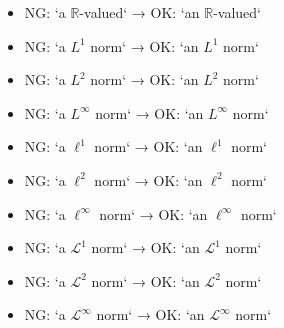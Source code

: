\begin{minipage}{0.5\textwidth}
	\begin{itemize}
		\item NG: `a $\mathbb{R}$-valued` → OK: `an $\mathbb{R}$-valued`
		\item NG: `a $L^1$ norm` → OK: `an $L^1$ norm`
		\item NG: `a $L^2$ norm` → OK: `an $L^2$ norm`
		\item NG: `a $L^\infty$ norm` → OK: `an $L^\infty$ norm`
		\item NG: `a $\ell^1$ norm` → OK: `an $\ell^1$ norm`
	\end{itemize}
\end{minipage}
\begin{minipage}{0.5\textwidth}
	\begin{itemize}
		\item NG: `a $\ell^2$ norm` → OK: `an $\ell^2$ norm`
		\item NG: `a $\ell^\infty$ norm` → OK: `an $\ell^\infty$ norm`
		\item NG: `a $\mathcal{L}^1$ norm` → OK: `an $\mathcal{L}^1$ norm`
		\item NG: `a $\mathcal{L}^2$ norm` → OK: `an $\mathcal{L}^2$ norm`
		\item NG: `a $\mathcal{L}^\infty$ norm` → OK: `an $\mathcal{L}^\infty$ norm`
	\end{itemize}
\end{minipage}
